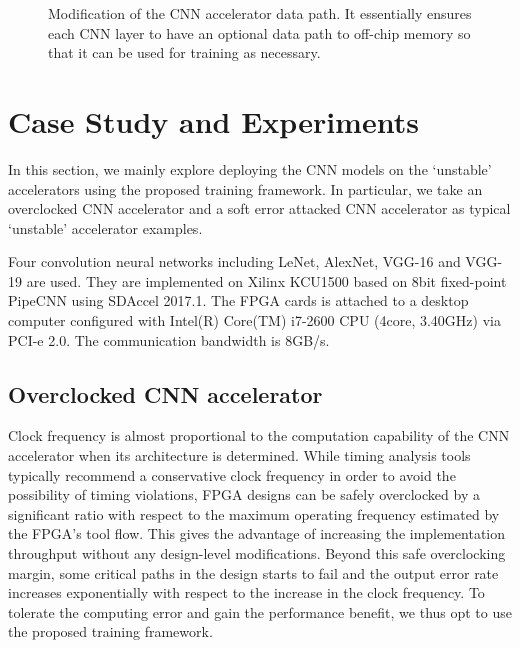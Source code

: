\begin{figure}
        \caption{Modification of the CNN accelerator data path. It essentially
ensures each CNN layer to have an optional data path to off-chip memory so that it
can be used for training as necessary.}
        \label{fig:change_of_accelerator}
        \vspace{-1em}
\end{figure}

\section{Case Study and Experiments} \label{sec:casestudy}
  In this section, we mainly explore deploying the CNN models on the ‘unstable’ accelerators 
using the proposed training framework. In particular, we take an overclocked CNN accelerator 
and a soft error attacked CNN accelerator as typical ‘unstable’ accelerator examples.

  Four convolution neural networks including LeNet, AlexNet, VGG-16 and VGG-19 are used.
They are implemented on Xilinx KCU1500 based on 8bit fixed-point PipeCNN using SDAccel 2017.1. 
The FPGA cards is attached to a desktop computer configured with Intel(R) Core(TM) i7-2600 
CPU (4core, 3.40GHz) via PCI-e 2.0. The communication bandwidth is 8GB/s.

\subsection{Overclocked CNN accelerator}
  Clock frequency is almost proportional to the computation capability of the CNN accelerator 
when its architecture is determined. While timing analysis tools typically recommend a 
conservative clock frequency in order to avoid the possibility of timing violations, 
FPGA designs can be safely overclocked by a significant ratio with respect to the maximum 
operating frequency estimated by the FPGA’s tool flow. This gives the advantage of increasing 
the implementation throughput without any design-level modifications. Beyond this safe overclocking 
margin, some critical paths in the design starts to fail and the output error rate increases 
exponentially with respect to the increase in the clock frequency. To tolerate the computing 
error and gain the performance benefit, we thus opt to use the proposed training framework.  

